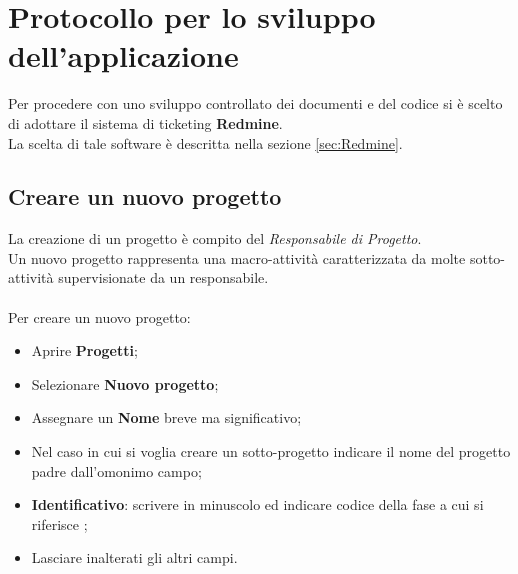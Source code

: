 \documentclass[a4paper,12pt]{article}
\begin{document}
\section{Protocollo per lo sviluppo dell’applicazione} 
Per procedere con uno sviluppo controllato dei documenti e del codice si è scelto di adottare il sistema di ticketing \textbf{Redmine}.\\ 
La scelta di tale software è descritta nella sezione \ref{sec:Redmine}.

\subsection{Creare un nuovo progetto} 
{
La creazione di un progetto è compito del \emph{Responsabile di Progetto}.\\ 
Un nuovo progetto rappresenta una macro-attività caratterizzata da molte sotto-attività 
supervisionate da un responsabile.\\\\ 
Per creare un nuovo progetto:
\begin{itemize}
\item Aprire \textbf{Progetti}; 
\item Selezionare \textbf{Nuovo progetto}; 
\item Assegnare un \textbf{Nome} breve ma significativo; 
\item Nel caso in cui si voglia creare un sotto-progetto indicare il nome del progetto padre dall’omonimo campo; 
\item \textbf{Identificativo}: scrivere in minuscolo ed indicare codice della fase a cui si riferisce ;
\item Lasciare inalterati gli altri campi. 
\end{itemize}
} 
\end{document}
